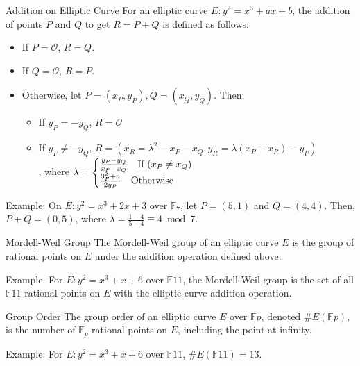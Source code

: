 \documentclass{article}
\begin{document}
\begin{definition}{Addition on Elliptic Curve}{}
For an elliptic curve $E: y^2 = x^3 + ax + b$, the addition of points $P$ and $Q$ to get $R = P + Q$ is defined as follows:

   \begin{itemize}
       \item If $P = \mathcal{O}$, $R = Q$.
       \item If $Q = \mathcal{O}$, $R = P$.
       \item Otherwise, let $P = (x_P, y_P), Q = (x_Q, y_Q)$. Then:
       \begin{itemize}
           \item If $y_P = -y_Q$, $R = \mathcal{O}$
           \item If $y_P \neq -y_Q$, $R = (x_R = \lambda^2 - x_P - x_Q, y_R = \lambda(x_P - x_R) - y_P)$\\, where $\lambda = \begin{cases}
               \frac{y_P - y_Q}{x_P - x_Q} \quad \hbox{If } (x_P \neq x_Q) \\
               \frac{3^{2}_{P} + a}{2y_P} \quad \hbox{Otherwise}
           \end{cases}$
       \end{itemize}
   \end{itemize}
\end{definition}

Example: On $E: y^2 = x^3 + 2x + 3$ over $\mathbb{F}_{7}$, let $P = (5, 1)$ and $Q = (4, 4)$. Then, $P + Q = (0, 5)$, where $\lambda = \frac{1 - 4}{5 - 4} \equiv 4 \bmod 7$.

\begin{definition}{Mordell-Weil Group}{}
The Mordell-Weil group of an elliptic curve $E$ is the group of rational points on $E$ under the addition operation defined above.
\end{definition}

Example: For $E: y^2 = x^3 + x + 6$ over $\mathbb{F}{11}$, the Mordell-Weil group is the set of all $\mathbb{F}{11}$-rational points on $E$ with the elliptic curve addition operation.

\begin{definition}{Group Order}{}
The group order of an elliptic curve $E$ over $\mathbb{F}{p}$, denoted $\#E(\mathbb{F}{p})$, is the number of $\mathbb{F}_{p}$-rational points on $E$, including the point at infinity.
\end{definition}
Example: For $E: y^2 = x^3 + x + 6$ over $\mathbb{F}{11}$, $\#E(\mathbb{F}{11}) = 13$.
\end{document}
